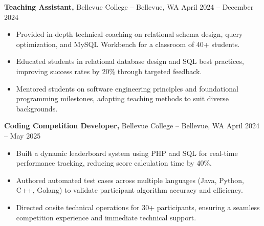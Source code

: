 \documentclass[11pt]{article}       %
\begin{document}
\textbf{Teaching Assistant,} {Bellevue College} -- Bellevue, WA \hfill April 2024 -- December 2024 \\
\vspace{-9pt}
\begin{itemize}
  \item Provided in-depth technical coaching on relational schema design, query optimization, and MySQL Workbench for a classroom of 40+ students.
  \item Educated students in relational database design and SQL best practices, improving success rates by 20\% through targeted feedback.
  \item Mentored students on software engineering principles and foundational programming milestones, adapting teaching methods to suit diverse backgrounds.
\end{itemize}

\textbf{Coding Competition Developer,} {Bellevue College} -- Bellevue, WA \hfill April 2024 -- May 2025 \\
\vspace{-9pt}
\begin{itemize}
  \item Built a dynamic leaderboard system using PHP and SQL for real-time performance tracking, reducing score calculation time by 40\%.
  \item Authored automated test cases across multiple languages (Java, Python, C++, Golang) to validate participant algorithm accuracy and efficiency.
  \item Directed onsite technical operations for 30+ participants, ensuring a seamless competition experience and immediate technical support.
\end{itemize}
\end{document}
